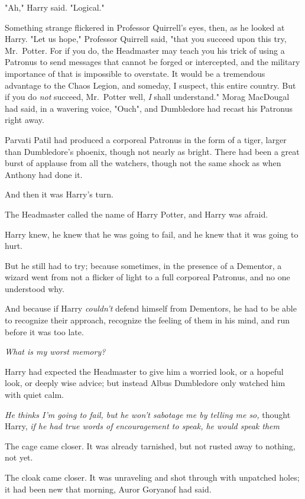 "Ah," Harry said. "Logical."

Something strange flickered in Professor Quirrell's eyes, then, as he looked at
Harry. "Let us hope," Professor Quirrell said, "that you succeed upon this try,
Mr.~Potter. For if you do, the Headmaster may teach you his trick of using a
Patronus to send messages that cannot be forged or intercepted, and the
military importance of that is impossible to overstate. It would be a
tremendous advantage to the Chaos Legion, and someday, I suspect, this entire
country. But if you do \emph{not} succeed, Mr.~Potter{\el} well, \emph{I}
shall understand."
\sbreak
Morag MacDougal had said, in a wavering voice, "Ouch", and Dumbledore had
recast his Patronus right away.

Parvati Patil had produced a corporeal Patronus in the form of a tiger, larger
than Dumbledore's phoenix, though not nearly as bright. There had been a great
burst of applause from all the watchers, though not the same shock as when
Anthony had done it.

And then it was Harry's turn.

The Headmaster called the name of Harry Potter, and Harry was afraid.

Harry knew, he knew that he was going to fail, and he knew that it was going to
hurt.

But he still had to try; because sometimes, in the presence of a Dementor, a
wizard went from not a flicker of light to a full corporeal Patronus, and no
one understood why.

And because if Harry \emph{couldn't} defend himself from Dementors, he had to
be able to recognize their approach, recognize the feeling of them in his mind,
and run before it was too late.

\emph{What is my worst memory{\el}?}

Harry had expected the Headmaster to give him a worried look, or a hopeful
look, or deeply wise advice; but instead Albus Dumbledore only watched him with
quiet calm.

\emph{He thinks I'm going to fail, but he won't sabotage me by telling me so,}
thought Harry, \emph{if he had true words of encouragement to speak, he would
speak them{\el}}

The cage came closer. It was already tarnished, but not rusted away to nothing,
not yet.

The cloak came closer. It was unraveling and shot through with unpatched holes;
it had been new that morning, Auror Goryanof had said.

